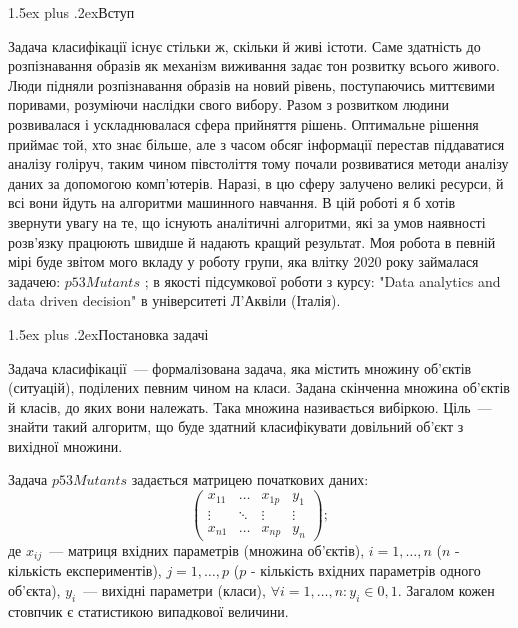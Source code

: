 \documentclass[12pt,a4paper]{article}
\makeatletter
\renewcommand{\section}{\@startsection{section}{1}{18pt}{3.25ex plus 1ex minus 0.2ex}%
{1.5ex plus .2ex}{\bfseries\rmfamily\Large}}
\theoremstyle{myplain}
\numberwithin{equation}{section}
\makeatother
\begin{document}
\newpage

\section{Вступ}

Задача класифікації існує стільки ж, скільки й живі істоти. Саме здатність до розпізнавання образів як механізм виживання задає тон розвитку всього живого. Люди підняли розпізнавання образів на новий рівень, поступаючись миттєвими поривами, розуміючи наслідки свого вибору. Разом з розвитком людини розвивалася і ускладнювалася сфера прийняття рішень. Оптимальне рішення приймає той, хто знає більше, але з часом обсяг інформації перестав піддаватися аналізу голіруч, таким чином півстоліття тому почали розвиватися методи аналізу даних за допомогою комп'ютерів. Наразі, в цю сферу залучено великі ресурси, й всі вони йдуть на алгоритми машинного навчання. В цій роботі я б хотів звернути увагу на те, що існують аналітичні алгоритми, які за умов наявності розв'язку працюють швидше й надають кращий результат. Моя робота в певній мірі буде звітом мого вкладу у роботу групи, яка влітку 2020 року займалася задачею: $p53Mutants$ \cite{Source} ; в якості підсумкової роботи з курсу: "Data analytics and data driven decision" в університеті Л'Аквіли (Італія).

\section{Постановка задачі}

Задача класифікації~--- формалізована задача, яка містить множину об'єктів (ситуацій), поділених певним чином на класи. Задана скінченна множина об'єктів й класів, до яких вони належать. Така множина називається вибіркою. Ціль~--- знайти такий алгоритм, що буде здатний класифікувати довільний об'єкт з вихідної множини.

Задача $p53Mutants$ задається матрицею початкових даних:
$$
\begin{pmatrix}
x_{11} & \ldots & x_{1p} & y_1\\
\vdots & \ddots & \vdots & \vdots\\
x_{n1} & \ldots & x_{np} & y_n
\end{pmatrix};
$$
де $ x_{ij} $~--- матриця вхідних параметрів (множина об'єктів), $ i = 1, \ldots , n $ ($n$ - кількість експериментів), $ j = 1, \ldots , p $ ($p$ - кількість вхідних параметрів одного об'єкта), $ y_{i} $~--- вихідні параметри (класи), $ \forall i = 1, \ldots , n : y_{i} \in {0, 1} $. Загалом кожен стовпчик є статистикою випадкової величини.
\end{document}
